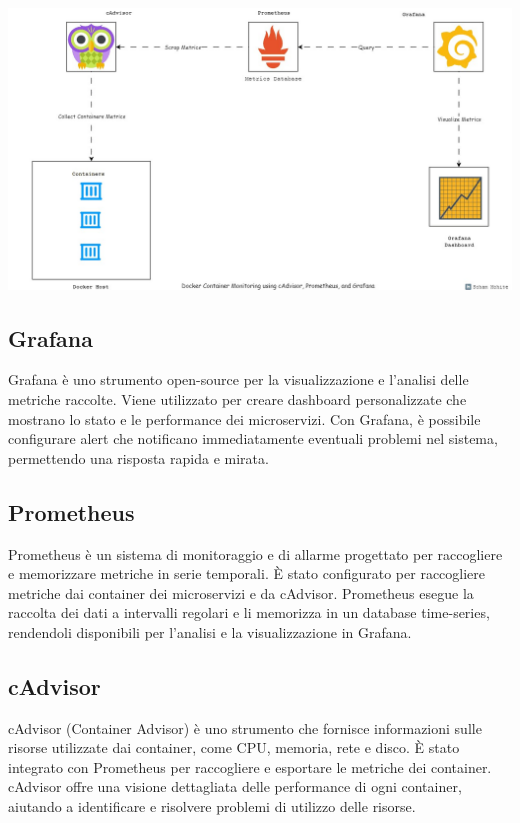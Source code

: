 \includegraphics[width=14cm]{report/img/monitor_schema.jpg}\\[0.5cm]

\subsection{Grafana}

Grafana è uno strumento open-source per la visualizzazione e l'analisi delle metriche raccolte. Viene utilizzato per creare dashboard personalizzate che mostrano lo stato e le performance dei microservizi. Con Grafana, è possibile configurare alert che notificano immediatamente eventuali problemi nel sistema, permettendo una risposta rapida e mirata.

\subsection{Prometheus}

Prometheus è un sistema di monitoraggio e di allarme progettato per raccogliere e memorizzare metriche in serie temporali. È stato configurato per raccogliere metriche dai container dei microservizi e da cAdvisor. Prometheus esegue la raccolta dei dati a intervalli regolari e li memorizza in un database time-series, rendendoli disponibili per l'analisi e la visualizzazione in Grafana.

\subsection{cAdvisor}

cAdvisor (Container Advisor) è uno strumento che fornisce informazioni sulle risorse utilizzate dai container, come CPU, memoria, rete e disco. È stato integrato con Prometheus per raccogliere e esportare le metriche dei container. cAdvisor offre una visione dettagliata delle performance di ogni container, aiutando a identificare e risolvere problemi di utilizzo delle risorse.

